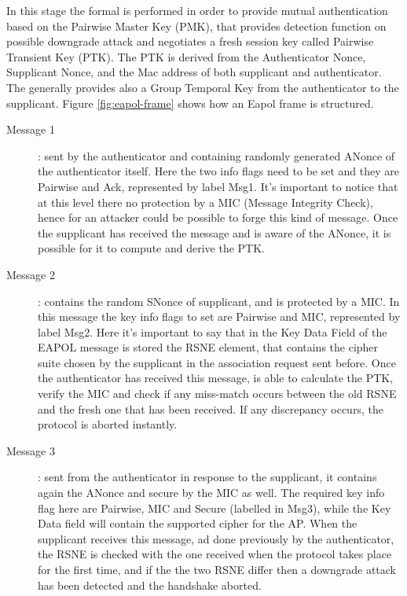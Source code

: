 \begin{description}
In this stage the formal \fwh is performed in order to provide mutual authentication based on the Pairwise Master Key (PMK), that provides detection function on possible downgrade attack and negotiates a fresh session key called Pairwise Transient Key (PTK).
The PTK is derived from the Authenticator Nonce, Supplicant Nonce, and the Mac address of both supplicant and authenticator. The \fwh generally provides also a Group Temporal Key from the authenticator to the supplicant. Figure \ref{fig:eapol-frame} shows how an Eapol frame is structured.

\begin{description}
  \item[Message 1]: sent by the authenticator and containing randomly generated ANonce of the authenticator itself. Here the two info flags need to be set and they are Pairwise and Ack, represented by label Msg1. It's important
  to notice that at this level there no protection by a MIC (Message Integrity Check), hence for an attacker could be possible to forge this kind of message.
  Once the supplicant has received the message and is aware of the ANonce, it is possible for it to compute and derive the PTK.

  \item[Message 2]: contains the random SNonce of supplicant, and is protected by a MIC. In this message the key info flags to set are Pairwise and MIC, represented by label Msg2. Here it's important to say that in the Key Data Field of the EAPOL message is stored
  the RSNE element, that contains the cipher suite chosen by the supplicant in the association request sent before. Once the authenticator has received this message, is able to calculate the PTK, verify the MIC and check if any miss-match occurs 
  between the old RSNE and the fresh one that has been received. If any discrepancy occurs, the protocol is aborted instantly.

  \item[Message 3]: sent from the authenticator in response to the supplicant, it contains again the ANonce and secure by the MIC as well. The required key info flag here are Pairwise, MIC and Secure (labelled in Msg3), while the Key Data field will contain the supported 
  cipher for the AP. When the supplicant receives this message, ad done previously by the authenticator, the RSNE is checked with the one received when the protocol takes place for the first time, and if the the two RSNE
  differ then a downgrade attack has been detected and the handshake aborted.


\end{description}
\end{description}
